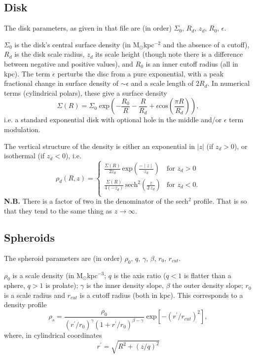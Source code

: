 \documentclass{article}
\begin{document}
\subsection{Disk}

The disk parameters, as given in that file are (in order) $\Sigma_0$,
$R_d$, $z_d$, $R_0$, $\epsilon$.

$\Sigma_0$ is the disk's central surface density (in M$_\odot$kpc$^{-2}$
and the absence of a cutoff), $R_d$ is the disk
scale radius, $z_d$ its scale height (though note there is a
difference between negative and positive values), and $R_0$ is an inner
cutoff radius (all in kpc). The term $\epsilon$ perturbs the disc from a pure exponential, with a peak fractional change in surface density of $\sim\epsilon$ and a scale length of $2R_d$. In numerical terms (cylindrical polars), these
give a surface density
\begin{equation}
\Sigma(R)=\Sigma_0\;\textrm{exp}\left(-\frac{R_0}{R}-\frac{R}{R_d}+
  \epsilon\textrm{cos}\left(\frac{\pi R}{R_d}\right)\right),
\end{equation}
i.e. a standard exponential disk with optional hole in the middle and/or
$\epsilon$ term modulation.

The vertical structure of the density is either an exponential in
$|z|$ (if $z_d>0$), or isothermal (if $z_d<0$), i.e.
\begin{equation}
\rho_d(R,z)=\left\{\begin{array}{lc}\frac{\Sigma(R)}{2z_d}\,\textrm{exp}\left(\frac{-\mid
        z\mid}{z_d}\right) & \textrm{for }z_d > 0 \\
\frac{\Sigma(R)}{4(-z_d)}\,\textrm{sech}^2\left(\frac{z}{2\,z_d}\right)
& \textrm{for } z_d
< 0.\\\end{array}\right.
\end{equation}
{\bf N.B.} There is a factor of two in the denominator of the sech$^2$
profile. That is so that they tend to the same thing as
$z\rightarrow\infty$.

\subsection{Spheroids}

The spheroid parameters are (in order) $\rho_0$, $q$, $\gamma$,
$\beta$, $r_0$, $r_{cut}$.

$\rho_0$ is a scale density (in M$_\odot$kpc$^{-3}$; $q$ is the axis ratio ($q<1$ is flatter
than a sphere, $q>1$ is prolate); $\gamma$ is the inner density slope,
$\beta$ the outer density slope; $r_0$ is a scale radius and $r_{cut}$
is a cutoff radius (both in kpc). This corresponds to a density profile
\begin{equation}
\rho_s=\frac{\rho_0}{(r^\prime/r_0)^\gamma(1+r^\prime/r_0)^{\beta-\gamma}}\;
\textrm{exp}\left[-\left(r^\prime/r_{cut}\right)^2\right],
\end{equation}
where, in cylindrical coordinates
\begin{equation}
r^\prime = \sqrt{R^2 + (z/q)^2}
\end{equation}
\end{document}
